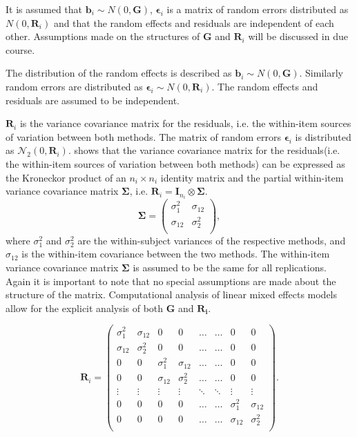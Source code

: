 \documentclass[12pt, a4paper]{report}
\theoremstyle{plain}
\theoremstyle{definition}
\theoremstyle{remark}
\begin{document}
It is assumed that $\boldsymbol{b}_i \sim N(0,\boldsymbol{G})$,
$\boldsymbol{\epsilon}_i$ is a matrix of random errors distributed as $N(0,\boldsymbol{R}_i)$ and
that the random effects and residuals are independent of each other. Assumptions made on the structures of $\boldsymbol{G}$ and $\boldsymbol{R}_i$ will be discussed in due course.

The distribution of the random effects is described as $\boldsymbol{b}_i \sim N(0,\boldsymbol{G})$. Similarly  random errors are distributed as $\boldsymbol{\epsilon}_i \sim N(0,\boldsymbol{R}_i)$. The random effects and residuals are assumed to be independent.



	$\boldsymbol{R}_{i}$ is the variance covariance matrix for the residuals, i.e. the within-item sources of variation between both methods.	
The matrix of random errors $\boldsymbol{\epsilon}_i$ is distributed as $\mathcal{N}_2(0,\boldsymbol{R}_i)$.
\citet{hamlett} shows that the variance covariance matrix for the residuals(i.e. the within-item sources of variation between both methods) can be expressed as the Kroneckor product of an $n_i \times n_i$ identity matrix and the partial within-item variance covariance matrix $\boldsymbol{\Sigma}$, i.e. $\boldsymbol{R}_{i} = \boldsymbol{I}_{n_{i}} \otimes \boldsymbol{\Sigma}$.
\[
\boldsymbol{\Sigma} = \left( \begin{array}{cc}
\sigma^2_{1} & \sigma_{12} \\
\sigma_{12} & \sigma^2_{2} \\
\end{array}\right),
\]
where $\sigma^2_{1}$ and $\sigma^2_{2}$ are the within-subject variances of the respective methods, and $\sigma_{12}$ is the within-item covariance between the two methods. The within-item variance covariance matrix $\boldsymbol{\Sigma}$ is assumed to be the same for all replications.  Again it is important to note that no special assumptions are made about the structure of the matrix. Computational analysis of linear mixed effects models allow for the explicit analysis of both $\boldsymbol{G}$ and $\boldsymbol{R_i}$.

	\[ \boldsymbol{R}_i =\left(
	\begin{array}{cccccccc}
	\sigma^2_1  & \sigma_{12} & 0 & 0 & \ldots & \ldots & 0 & 0 \\
	\sigma_{12} & \sigma^2_2  & 0 & 0  & \ldots & \ldots & 0 & 0\\
	
	0 & 0 &\sigma^2_1  & \sigma_{12} & \ldots & \ldots& 0 &  0 \\
	0 & 0 &\sigma_{12} & \sigma^2_2  & \ldots & \ldots & 0 & 0 \\
	\vdots & \vdots &\vdots & \vdots & \ddots & \ddots& \vdots & \vdots \\
	
	0 & 0 &0 & 0 & \ldots & \ldots&\sigma^2_1  & \sigma_{12} \\
	0 & 0 &0 & 0 & \ldots & \ldots &\sigma_{12} & \sigma^2_2 \\
	\end{array}
	\right). \]
	
\end{document}
